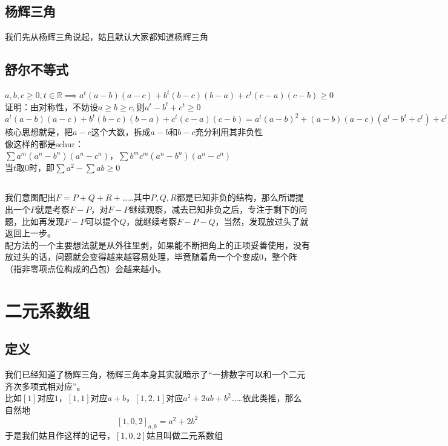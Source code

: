 \documentclass[UTF8]{ctexart}
\begin{document}
\subsection{杨辉三角}
我们先从杨辉三角说起，姑且默认大家都知道杨辉三角
\subsection{舒尔不等式}
$ a,b,c \geq 0,t\in \mathbb{R}\implies a^{t}(a-b)(a-c)+b^{t}(b-c)(b-a)+c^{t}(c-a)(c-b)\geq 0$\\
证明：由对称性，不妨设$ a\geq b\geq c,则a^{t}-b^{t}+c^{t}\geq 0 $\\
$ a^{t}(a-b)(a-c)+b^{t}(b-c)(b-a)+c^{t}(c-a)(c-b)=a^{t}(a-b)^{2}+(a-b)(a-c)(a^{t}-b^{t}+c^{t})+c^{t}(b-c)^{2}\geq 0 $\\
核心思想就是，把$ a-c $这个大数，拆成$ a-b $和$ b-c $充分利用其非负性\\
像这样的都是schur：\\
$\displaystyle  \sum  a^{m}\left(a^{n}-b^{n}\right)\left(a^{n}-c^{n}\right)$，$\displaystyle \sum b^{m} c^{m}\left(a^{n}-b^{n}\right)\left(a^{n}-c^{n}\right)$\\
当$ t $取$ 0 $时，即$ \displaystyle  \sum a^{2}-\displaystyle  \sum ab\geq 0 $
\subsection{}
我们意图配出$ F=P+Q+R+ $……其中$ P,Q,R $都是已知非负的结构，那么所谓提出一个$ P $就是考察$ F-P $，对$ F-P $继续观察，减去已知非负之后，专注于剩下的问题，比如再发现$ F-P $可以提个$ Q $，就继续考察$ F-P-Q $，当然，发现放过头了就返回上一步。\\

配方法的一个主要想法就是从外往里剥，如果能不断把角上的正项妥善使用，没有放过头的话，问题就会变得越来越容易处理，毕竟随着角一个个变成0，整个阵（指非零项点位构成的凸包）会越来越小。
\section{二元系数组}
\subsection{定义}
我们已经知道了杨辉三角，杨辉三角本身其实就暗示了“一排数字可以和一个二元齐次多项式相对应”。\\
比如$ [1] $对应$ 1 $，$ [1,1] $对应$ a+b $，$ [1,2,1] $对应$ a^{2}+2ab+b^{2} $……依此类推，那么自然地
$$[1,0,2]_{a, b}=a^{2}+2 b^{2}$$
于是我们姑且作这样的记号，$ [1,0,2] $姑且叫做二元系数组
\end{document}
